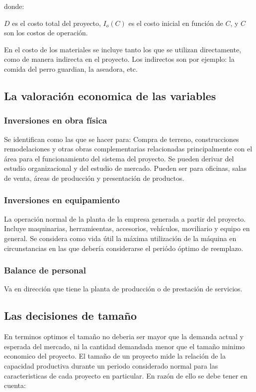 \documentclass[a4paper, 11pt, oneside]{article}
\begin{document}
donde:

$D$ es el costo total del proyecto, $I_o(C)$ es el costo inicial  en función de $C$, y $C$ son
los costos de operación.

En el costo de los materiales se incluye tanto los que se utilizan directamente, como de manera
indirecta en el proyecto. Los indirectos son por ejemplo: la comida del perro guardian, la aseadora,
etc. 

\subsection{La valoración economica de las variables}

\subsubsection{Inversiones en obra física}
Se identifican como las que se hacer para: Compra de terreno, construcciones remodelaciones y otras obras 
complementarias relacionadas principalmente con el área para el funcionamiento del sistema del proyecto. Se 
pueden derivar del estudio organizacional y del estudio de mercado. Pueden ser para oficinas, salas de venta,
áreas de producción y presentación de productos.

\subsubsection{Inversiones en equipamiento}
La operación normal de la planta de la empresa generada a partir del proyecto. Incluye maquinarias, 
herramieentas, accesorios, vehículos, moviliario y equipo en general. Se considera como vida útil la
máxima utilización de la máquina en circunstancias en las que debería considerarse el periódo óptimo de reemplazo.

\subsubsection{Balance de personal}
Va en dirección que tiene la planta de producción o de prestación de servicios.

\subsection{Las decisiones de tamaño}
En terminos optimos el tamaño no deberia ser mayor que la demanda actual y esperada del mercado, ni la cantidad
demandada menor que el tamaño minimo economico del proyecto. El tamaño de un proyecto mide la relación de la
capacidad productiva durante un periodo considerado normal para las caracteristicas de cada proyecto en particular.
En razón de ello se debe tener en cuenta:
\end{document}
